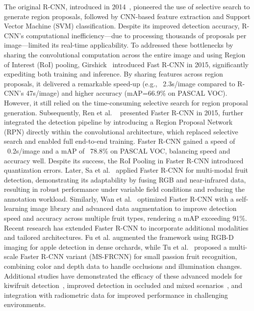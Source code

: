 \documentclass{ieeeaccess}
\begin{document}
The original R-CNN, introduced in 2014~\cite{girshick2014rcnn}, pioneered the use of selective search to generate region proposals, followed by CNN-based feature extraction and Support Vector Machine (SVM) classification. Despite its improved detection accuracy, R-CNN's computational inefficiency—due to processing thousands of proposals per image—limited its real-time applicability.
To addressed these bottlenecks by sharing the convolutional computation across the entire image and using Region of Interest (RoI) pooling, Girshick~\cite{girshick2015fast} introduced Fast R-CNN in 2015, significantly expediting both training and inference. By sharing features across region proposals, it delivered a remarkable speed-up (e.g., ~2.3s/image compared to R-CNN's 47s/image) and higher accuracy (mAP=66.9\% on PASCAL VOC). However, it still relied on the time-consuming selective search for region proposal generation.
Subsequently, Ren et al. ~\cite{ren2015faster} presented Faster R-CNN in 2015, further integrated the detection pipeline by introducing a Region Proposal Network (RPN) directly within the convolutional architecture, which replaced selective search and enabled full end-to-end training. Faster R-CNN gained a speed of ~0.2s/image and a mAP of ~78.8\% on PASCAL VOC, balancing speed and accuracy well. Despite its success, the RoI Pooling in Faster R-CNN introduced quantization errors. 
Later, Sa et al.~\cite{sa2016deepfruits} applied Faster R-CNN for multi-modal fruit detection, demonstrating its adaptability by fusing RGB and near-infrared data, resulting in robust performance under variable field conditions and reducing the annotation workload. Similarly, Wan et al.~\cite{wan2020faster} optimized Faster R-CNN with a self-learning image library and advanced data augmentation to improve detection speed and accuracy across multiple fruit types, rendering a mAP exceeding 91\%.
Recent research has extended Faster R-CNN to incorporate additional modalities and tailored architectures. Fu et al.\cite{fu2020faster} augmented the framework using RGB-D imaging for apple detection in dense orchards, while Tu et al.~\cite{tu2020passion} proposed a multi-scale Faster R-CNN variant (MS-FRCNN) for small passion fruit recognition, combining color and depth data to handle occlusions and illumination changes. Additional studies have demonstrated the efficacy of these advanced models for kiwifruit detection~\cite{fu2018kiwifruit}, improved detection in occluded and mixed scenarios~\cite{gene2019multi, mu2020intact}, and integration with radiometric data for improved performance in challenging environments.
\end{document}
